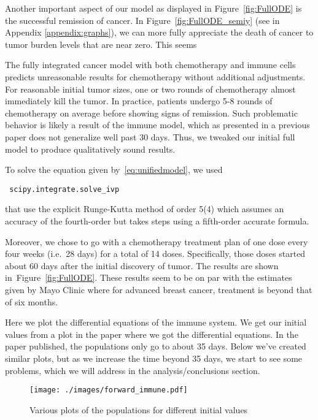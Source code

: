 \documentclass[11pt]{amsart}
\begin{document}
Another important aspect of our model as displayed in Figure~\ref{fig:FullODE} is the successful remission of cancer.
In Figure~\ref{fig:FullODE_semiy} (see in Appendix \ref{appendix:graphs}), we can more fully appreciate the death of cancer to tumor burden levels that are near zero.
This seems 

The fully integrated cancer model with both chemotherapy and immune cells predicts unreasonable results for chemotherapy without additional adjustments. For reasonable initial tumor sizes, one or two rounds of chemotherapy almost immediately kill the tumor. In practice, patients undergo 5-8 rounds of chemotherapy on average before showing signs of remission. Such problematic behavior is likely a result of the immune model, which as presented in a previous paper does not generalize well past 30 days. Thus, we tweaked our initial full model to produce qualitatively sound results.
 


To solve the equation given by\ \eqref{eq:unifiedmodel}, we used \begin{verbatim} scipy.integrate.solve_ivp \end{verbatim}
that use the explicit Runge-Kutta method of order 5(4) which assumes an accuracy of the fourth-order but takes steps using a fifth-order accurate formula.

Moreover, we chose to go with a chemotherapy treatment plan of one dose every four weeks (i.e.\ 28 days) for a total of 14 doses.
Specifically, those doses started about 60 days after the initial discovery of tumor.
The results are shown in\ Figure~\ref{fig:FullODE}.
These results seem to be on par with the estimates given by Mayo Clinic where for advanced breast cancer, treatment is beyond that of six months.

Here we plot the differential equations of the immune system. 
We get our initial values from a plot in the paper where we got the differential equations. 
In the paper published, the populations only go to about 35 days. 
Below we've created similar plots, but as we increase the time beyond 35 days, 
we start to see some problems, which we will address in the analysis/conclusions section.

\begin{figure}[h!]
\begin{center} %
\texttt{[image: ./images/forward\_immune.pdf]} %
\end{center}
\caption{Various plots of the populations for different initial values}
\label{fig:forward} %
\end{figure}
\end{document}
